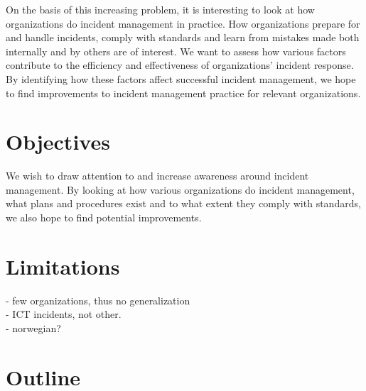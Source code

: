 On the basis of this increasing problem, it is interesting to look at how organizations do incident management in practice. How organizations prepare for and handle incidents, comply with standards and learn from mistakes made both internally and by others are of interest. We want to assess how various factors contribute to the efficiency and effectiveness of organizations’ incident response. By identifying how these factors affect successful incident management, we hope to find improvements to incident management practice for relevant organizations. 




\section{Objectives}
We wish to draw attention to and increase awareness around incident management. By looking at how various organizations do incident management, what plans and procedures exist and to what extent they comply with standards, we also hope to find potential improvements.


\section{Limitations}

- few organizations, thus no generalization\\
- ICT incidents, not other.\\
- norwegian?

\section{Outline}